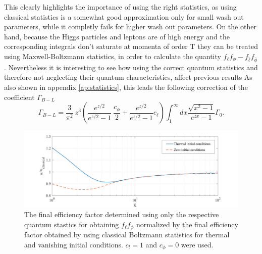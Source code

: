 This clearly highlights the importance of using the right statistics, as using classical statistics is a somewhat good approximation only for small wash out parameters, while it completly fails for higher wash out parameters.\newline \indent
On the other hand, because the Higgs particles and leptons are of high energy and the corresponding integrals don't saturate at momenta of order T they can be treated using Maxwell-Boltzmann statistics, in order to calculate the quantity $f_\ell f_\phi-f_{\bar{\ell}}f_{\bar{\phi}}$. Nevertheless it is interesting to see how using the correct quantum statistics and therefore not neglecting their quantum characteristics, affect previous results
As also shown in appendix \ref{ap:statistics}, this leads the following correction of the coefficient $\Gamma_{B-L}$
\begin{equation}
\Gamma_{B-L}=\frac{3}{\pi^2}\:z^3\left(\frac{e^{z/2}}{e^{z/2}-1}\:\frac{c_\phi}{2}+\frac{e^{z/2}}{e^{z/2}-1}c_\ell\right)\int_{1}^{\infty}dx\frac{\sqrt{x^2-1}}{e^{zx}-1}\Gamma_0.
\label{eq:B-L_corrected}
\end{equation}
\begin{figure}[H]
	\centering
	\includegraphics[width=\linewidth]{Images/quantum1}
	\caption{The final efficiency factor determined using only the respective quantum stastics for obtaining $f_\ell f_\phi$ normalized by the final efficiency factor obtained by using classical Boltzmann statistics for thermal and vanishing initial conditions. $c_l=1$ and $c_\phi=0$ were used.}
	\label{fig:quantum1}
\end{figure} \noindent
{}
